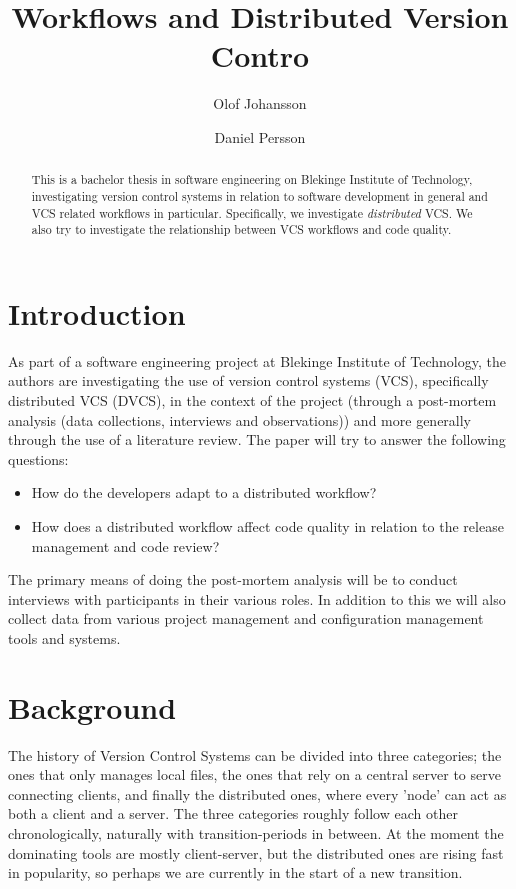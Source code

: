 \documentclass{llncs}
\title{Workflows and Distributed Version Contro}
\author{Olof Johansson \and Daniel Persson}
\institute{Blekinge Institute of Technology}
\begin{document}
\maketitle

\begin{abstract}
 This is a bachelor thesis in software engineering on Blekinge
 Institute of Technology, investigating version control systems
 in relation to software development in general and VCS related
 workflows in particular. Specifically, we investigate
 \emph{distributed} VCS. We also try to investigate the
 relationship between VCS workflows and code quality.
\end{abstract}

\section{Introduction}

As part of a software engineering project at Blekinge Institute of
Technology, the authors are investigating the use of version control
systems (VCS), specifically distributed VCS (DVCS), in the context of
the project (through a post-mortem analysis (data collections, 
interviews and observations)) and more generally through the use of a
literature review. The paper will try to answer the following questions:

\begin{itemize}
 \item How do the developers adapt to a distributed workflow?
 \item How does a distributed workflow affect code quality in relation
       to the release management and code review?
\end{itemize}

The primary means of doing the post-mortem analysis will be
to conduct interviews with participants in their various roles. In
addition to this we will also collect data from various project
management and configuration management tools and systems.

\section{Background}

The history of Version Control Systems can be divided into three
categories; the ones that only manages local files, the ones that rely
on a central server to serve connecting clients, and finally the
distributed ones, where every 'node' can act as both a client and a
server. The three categories roughly follow each other
chronologically, naturally with transition-periods in between. At the
moment the dominating tools are mostly client-server, but the
distributed ones are rising fast in popularity, so perhaps we are
currently in the start of a new transition.
\end{document}
